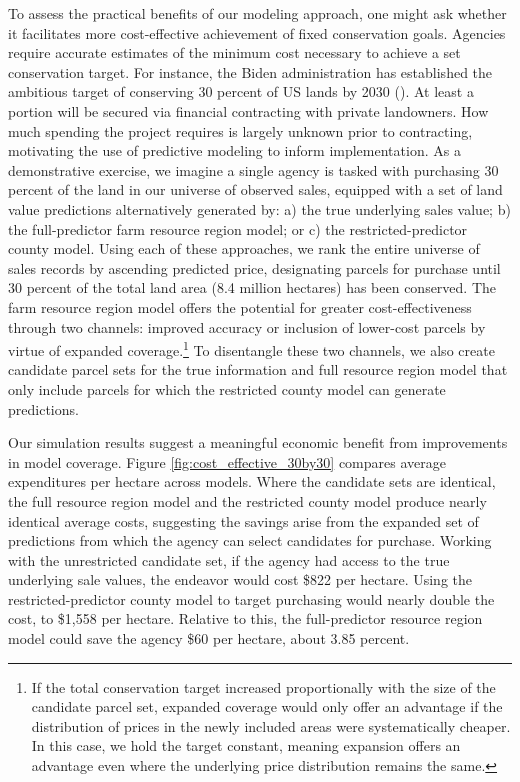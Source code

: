 \documentclass[12pt]{article}
\begin{document}
To assess the practical benefits of our modeling approach, one might ask whether it facilitates more cost-effective achievement of fixed conservation goals. Agencies require accurate estimates of the minimum cost necessary to achieve a set conservation target. For instance, the Biden administration has established the ambitious target of conserving 30 percent of US lands by 2030 (\cite{ceq2021}). At least a portion will be secured via financial contracting with private landowners. How much spending the project requires is largely unknown prior to contracting, motivating the use of predictive modeling to inform implementation. As a demonstrative exercise, we imagine a single agency is tasked with purchasing 30 percent of the land in our universe of observed sales, equipped with a set of land value predictions alternatively generated by: a) the true underlying sales value; b) the full-predictor farm resource region model; or c) the restricted-predictor county model. Using each of these approaches, we rank the entire universe of sales records by ascending predicted price, designating parcels for purchase until 30 percent of the total land area (8.4 million hectares) has been conserved. The farm resource region model offers the potential for greater cost-effectiveness through two channels: improved accuracy or inclusion of lower-cost parcels by virtue of expanded coverage.\footnote{If the total conservation target increased proportionally with the size of the candidate parcel set, expanded coverage would only offer an advantage if the distribution of prices in the newly included areas were systematically cheaper. In this case, we hold the target constant, meaning expansion offers an advantage even where the underlying price distribution remains the same.} To disentangle these two channels, we also create candidate parcel sets for the true information and full resource region model that only include parcels for which the restricted county model can generate predictions.

Our simulation results suggest a meaningful economic benefit from improvements in model coverage. Figure \ref{fig:cost_effective_30by30} compares average expenditures per hectare across models. Where the candidate sets are identical, the full resource region model and the restricted county model produce nearly identical average costs, suggesting the savings arise from the expanded set of predictions from which the agency can select candidates for purchase. Working with the unrestricted candidate set, if the agency had access to the true underlying sale values, the endeavor would cost \$822 per hectare. Using the restricted-predictor county model to target purchasing would nearly double the cost, to \$1,558 per hectare. Relative to this, the full-predictor resource region model could save the agency \$60 per hectare, about 3.85 percent. 
\end{document}
